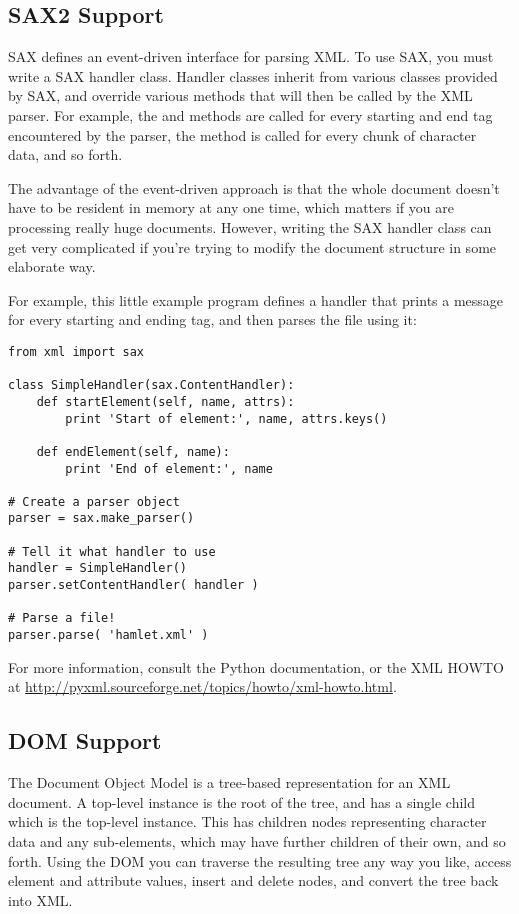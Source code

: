 \documentclass{howto}
\begin{document}
\subsection{SAX2 Support}

SAX defines an event-driven interface for parsing XML.  To use SAX,
you must write a SAX handler class.  Handler classes inherit from
various classes provided by SAX, and override various methods that
will then be called by the XML parser.  For example, the
 and  methods are called for
every starting and end tag encountered by the parser, the
 method is called for every chunk of character
data, and so forth.

The advantage of the event-driven approach is that the whole
document doesn't have to be resident in memory at any one time, which
matters if you are processing really huge documents.  However, writing
the SAX handler class can get very complicated if you're trying to
modify the document structure in some elaborate way.

For example, this little example program defines a handler that prints
a message for every starting and ending tag, and then parses the file
 using it:

\begin{verbatim}
from xml import sax

class SimpleHandler(sax.ContentHandler):
    def startElement(self, name, attrs):
        print 'Start of element:', name, attrs.keys()

    def endElement(self, name):
        print 'End of element:', name

# Create a parser object
parser = sax.make_parser()

# Tell it what handler to use
handler = SimpleHandler()
parser.setContentHandler( handler )

# Parse a file!
parser.parse( 'hamlet.xml' )
\end{verbatim}

For more information, consult the Python documentation, or the XML
HOWTO at \url{http://pyxml.sourceforge.net/topics/howto/xml-howto.html}.

\subsection{DOM Support}

The Document Object Model is a tree-based representation for an XML
document.  A top-level  instance is the root of the
tree, and has a single child which is the top-level 
instance. This  has children nodes representing
character data and any sub-elements, which may have further children
of their own, and so forth.  Using the DOM you can traverse the
resulting tree any way you like, access element and attribute values,
insert and delete nodes, and convert the tree back into XML.
\end{document}
